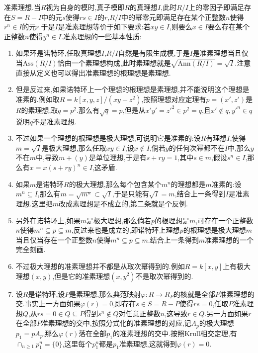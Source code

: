 准素理想.当$R$视为自身的模时,真子模即$R$的真理想$I$,此时$R/I$上的零因子即满足存在$S=R-I$中的元$s$使得$rs\in I$的$r$,$R/I$中的幂零元即满足存在某个正整数$n$使得$r^n\in I$的元$r$.于是$I$是准素理想等价于如下要求:若$xy\in I$,则要么$x\in I$要么存在某个正整数$n$使得$y^n\in I$.准素理想的一些基本性质:
\begin{enumerate}
	\item 如果环是诺特环,任取真理想$I$,$R/I$自然是有限生成模,于是$I$是准素理想当且仅当$\mathrm{Ass}(R/I)$恰由一个素理想构成,此时素理想就是$\sqrt{\mathrm{Ann}(R/I)}=\sqrt{I}$.注意直接从定义也可以得出准素理想的根理想是素理想.
	\item 但是反过来,如果诺特环上一个理想的根理想是素理想,并不能说明这个理想是准素的.例如取$R=k[x,y,z]/(xy-z^2)$,按照理想对应定理有$p=(x',z')$是$R$的素理想,取$q=p^2$.那么有$\sqrt{q}=p$,但是从$x'y'=z'^2\in p^2=q$,且$x'\not\in q,y'^n\in q$说明$q$不是准素理想.
	\item 不过如果一个理想的根理想是极大理想,可说明它是准素的:设$R$有理想$I$,使得$m=\sqrt{I}$是极大理想,那么任取$xy\in I$,设$x\not\in I$,倘若$y$的任何次幂都不在$I$中,那么$y$不在$m$中,导致$m+(y)$是单位理想,于是有$s+ry=1$,其中$s\in m$,假设$s^n\in I$,那么有$x=x(s+ry)^n\in I$,这矛盾.
	\item 如果$m$是诺特环$R$的极大理想,那么每个包含某个$m^n$的理想都是$m$准素的:设$m^n\subseteq I$,那么有$m=\sqrt{m^n}\subset\sqrt{I}$,于是只能有$\sqrt{I}=m$,结合上一条得到$I$是准素理想.这里把$m$改成素理想是不成立的,第二条就是个反例.
	\item 另外在诺特环上,如果$m$是极大理想,那么倘若$p$的根理想是$m$,可存在一个正整数$n$使得$m^n\subseteq p\subseteq m$,反过来也是成立的,即诺特环上理想$p$的根理想是极大理想$m$当且仅当存在一个正整数$n$使得$m^n\subseteq p\subseteq m$.结合上一条得到$m$准素理想的一个完全刻画.
	\item 不过极大理想的准素理想并不都是从取次幂得到的.例如$R=k[x,y]$上有极大理想$(x,y)$,但是它的准素理想$(x,y^2)$不是取次幂得到的.
	\item 设$R$是诺特环,设$P$是素理想,那么典范映射$\varphi:R\to R_P$的核就是全部$P$准素理想的交.事实上一方面如果$\varphi(r)=0$,即存在$s\in S=R-P$使得$rs=0$,任取$P$准素理想$Q$,从$rs=0\in Q\subseteq P$得到$s^n\not\in Q$对任意正整数$n$,这导致$r\in Q$.另一方面如果$r$在全部$P$准素理想的交中,按照分式化的准素理想的对应,记$A_p$的极大理想$p_1=pA_p$,那么$\varphi(r)$落在全部$p_1$的准素理想的交中.按照Krull相交定理,有$\cap_{n\ge1}p_1^n=\{0\}$,这里每个$p_1^n$都是$p_1$准素理想,这就得到$\varphi(r)=0$.
\end{enumerate}

